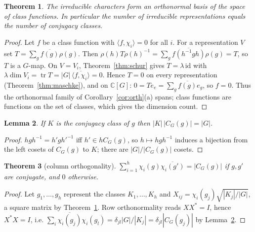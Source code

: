 \documentclass[11pt]{article}
\newtheorem{theorem}{Theorem}
\newtheorem{lemma}[theorem]{Lemma}
\theoremstyle{definition}
\theoremstyle{remark}
\newcommand{\claim}[1]{\leavevmode\marginpar{\raggedright\scriptsize\texttt{#1}}}
\newcommand{\C}{\mathbb{C}}
\newcommand{\tr}{\operatorname{tr}}
\newcommand{\ip}[2]{\langle #1, #2\rangle}
\begin{document}
\begin{theorem}\label{thm:basis}\claim{T-4}
The irreducible characters form an orthonormal basis of the space of class functions. In particular the number of
irreducible representations equals the number of conjugacy classes.
\end{theorem}
\begin{proof}
Let $f$ be a class function with $\ip{f}{\chi_i}=0$ for all $i$. For a representation $V$ set $T=\sum_g\overline{f(g)}\rho(g)$.
Then $\rho(h)T\rho(h)^{-1}=\sum_g\overline{f(h^{-1}gh)}\rho(g)=T$, so $T$ is a $G$-map. On $V=V_i$, Theorem~\ref{thm:schur} gives
$T=\lambda\,\mathrm{id}$ with $\lambda\dim V_i=\tr T=|G|\,\overline{\ip{f}{\chi_i}}=0$. Hence $T=0$ on every representation
(Theorem~\ref{thm:maschke}), and on $\C[G]$: $0=Te_e=\sum_g\overline{f(g)}e_g$, so $f=0$. Thus the orthonormal family of
Corollary~\ref{cor:orth}(a) spans; class functions are functions on the set of classes, which gives the dimension count.
\end{proof}

\begin{lemma}\label{lem:orbit}\claim{L-3}
If $K$ is the conjugacy class of $g$ then $|K|\,|C_G(g)|=|G|$.
\end{lemma}
\begin{proof}
$hgh^{-1}=h'gh'^{-1}$ iff $h'\in hC_G(g)$, so $h\mapsto hgh^{-1}$ induces a bijection from the left cosets of $C_G(g)$ to $K$;
there are $|G|/|C_G(g)|$ cosets.
\end{proof}

\begin{theorem}[column orthogonality]\label{thm:col}\claim{T-5}
$\sum_{i=1}^h\chi_i(g)\overline{\chi_i(g')}=|C_G(g)|$ if $g,g'$ are conjugate, and $0$ otherwise.
\end{theorem}
\begin{proof}
Let $g_1,\dots,g_h$ represent the classes $K_1,\dots,K_h$ and $X_{ij}=\chi_i(g_j)\sqrt{|K_j|/|G|}$, a square matrix by
Theorem~\ref{thm:basis}. Row orthonormality reads $XX^*=I$, hence $X^*X=I$, i.e.
$\sum_i\overline{\chi_i(g_j)}\chi_i(g_l)=\delta_{jl}|G|/|K_j|=\delta_{jl}|C_G(g_j)|$ by Lemma~\ref{lem:orbit}.
\end{proof}
\end{document}
